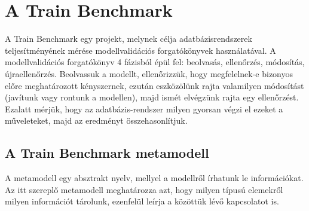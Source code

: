 \chapter{A Train Benchmark}

A Train Benchmark egy projekt, melynek célja adatbázisrendszerek teljesítményének mérése modellvalidációs forgatókönyvek használatával. A modellvalidációs forgatókönyv 4 fázisból épül fel: beolvasás, ellenőrzés, módosítás, újraellenőrzés. Beolvassuk a modellt, ellenőrizzük, hogy megfelelnek-e bizonyos előre meghatározott kényszernek, ezután eszközölünk rajta valamilyen módosítást (javítunk vagy rontunk a modellen), majd ismét elvégzünk rajta egy ellenőrzést. Ezalatt mérjük, hogy az adatbázis-rendszer milyen gyorsan végzi el ezeket a műveleteket, majd az eredményt összehasonlítjuk. 

\section{A Train Benchmark metamodell}

A metamodell egy absztrakt nyelv, mellyel a modellről írhatunk le információkat. Az itt szereplő metamodell meghatározza azt, hogy milyen típusú elemekről milyen információt tárolunk, ezenfelül leírja a közöttük lévő kapcsolatot is.

